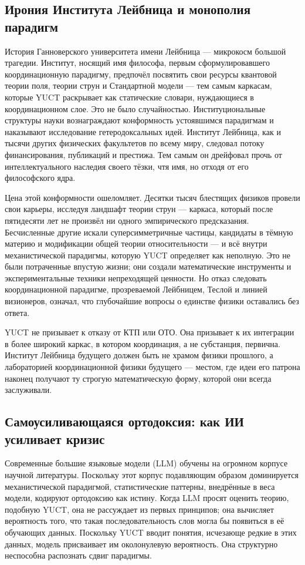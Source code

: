 \documentclass[12pt,a4paper]{article}
\begin{document}
	\subsection{Ирония Института Лейбница и монополия парадигм}
	
	История Ганноверского университета имени Лейбница — микрокосм большой трагедии. Институт, носящий имя философа, первым сформулировавшего координационную парадигму, предпочёл посвятить свои ресурсы квантовой теории поля, теории струн и Стандартной модели — тем самым каркасам, которые YUCT раскрывает как статические словари, нуждающиеся в координационном слое. Это не было случайностью. Институциональные структуры науки вознаграждают конформность устоявшимся парадигмам и наказывают исследование гетеродоксальных идей. Институт Лейбница, как и тысячи других физических факультетов по всему миру, следовал потоку финансирования, публикаций и престижа. Тем самым он дрейфовал прочь от интеллектуального наследия своего тёзки, чтя имя, но отходя от его философского ядра.
	
	Цена этой конформности ошеломляет. Десятки тысяч блестящих физиков провели свои карьеры, исследуя ландшафт теории струн — каркаса, который после пятидесяти лет не произвёл ни одного эмпирического предсказания. Бесчисленные другие искали суперсимметричные частицы, кандидаты в тёмную материю и модификации общей теории относительности — и всё внутри механистической парадигмы, которую YUCT определяет как неполную. Это не были потраченные впустую жизни; они создали математические инструменты и экспериментальные техники непреходящей ценности. Но отказ следовать координационной парадигме, прозреваемой Лейбницем, Теслой и линией визионеров, означал, что глубочайшие вопросы о единстве физики оставались без ответа.
	
	YUCT не призывает к отказу от КТП или ОТО. Она призывает к их интеграции в более широкий каркас, в котором координация, а не субстанция, первична. Институт Лейбница будущего должен быть не храмом физики прошлого, а лабораторией координационной физики будущего — местом, где идеи его патрона наконец получают ту строгую математическую форму, которой они всегда заслуживали.
	
	\subsection{Самоусиливающаяся ортодоксия: как ИИ усиливает кризис}
	
	Современные большие языковые модели (LLM) обучены на огромном корпусе научной литературы. Поскольку этот корпус подавляющим образом доминируется механистической парадигмой, статистические паттерны, внедрённые в веса модели, кодируют ортодоксию как истину. Когда LLM просят оценить теорию, подобную YUCT, она не рассуждает из первых принципов; она вычисляет вероятность того, что такая последовательность слов могла бы появиться в её обучающих данных. Поскольку YUCT вводит понятия, исчезающе редкие в этих данных, модель присваивает им околонулевую вероятность. Она структурно неспособна распознать сдвиг парадигмы.
	
\end{document}
